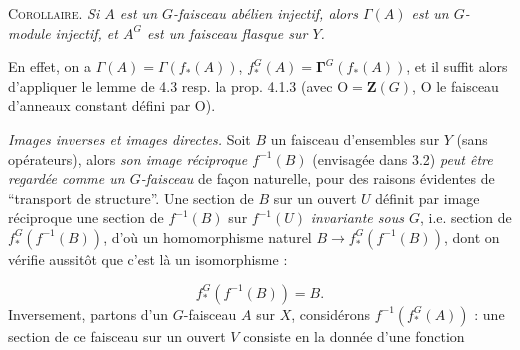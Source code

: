 \textsc{Corollaire.} \textit{Si $A$ est un $G$-faisceau abélien
injectif, alors $\Gamma(A)$ est un $G$-module injectif, et $A^G$ est un
faisceau flasque sur $Y$.}

En effet, on a $\Gamma(A)=\Gamma(f_*(A))$, $f_*^G(A)=\mathbf{\Gamma}^G(f_*(A))$, et il
suffit alors d'appliquer le lemme de 4.3 resp. la prop. 4.1.3 (avec
${\mathrm O}=\mathbf Z(G)$, ${\mathrm O}$ le faisceau d'anneaux constant défini par ${\mathrm O}$).

\textit{Images inverses et images directes.} Soit $B$ un faisceau
d'ensembles sur $Y$ (sans opérateurs), alors \textit{son image réciproque
$f^{-1}(B)$} (envisagée dans 3.2) \textit{peut être regardée comme un
$G$-faisceau} de façon naturelle, pour des raisons évidentes de ``transport
de structure''. Une section de $B$ sur un ouvert $U$ définit par image
réciproque une section de $f^{-1}(B)$ sur $f^{-1}(U)$ \textit{invariante sous
$G$}, i.e. section de $f_*^G(f^{-1}(B))$, d'où un homomorphisme naturel
$B\to f_*^G(f^{-1}(B))$, dont on vérifie aussitôt que c'est là un
isomorphisme :

\[
f_*^G(f^{-1}(B))=B.
\tag{5.1.1}
\]
Inversement, partons d'un $G$-faisceau $A$ sur $X$, considérons
$f^{-1}(f_*^G(A))$ : une section de ce faisceau sur un ouvert $V$ consiste en
la donnée d'une fonction


